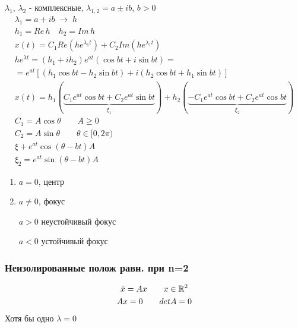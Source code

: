 \documentclass{article}
\begin{document}
\hr
  $\lambda_1$, $\lambda_2$ - комплексные, $\lambda_{1,2}=a\pm ib$, $b>0$
    \begin{gather*}
      \lambda_1=a+ib \; \rightarrow \; h\\ 
      h_1=Re\, h \quad h_2=Im \, h \\ 
      x(t)=C_1 Re(he^{\lambda_1 t}) + C_2 Im(he^{\lambda_1t}) \\ 
      he^{\lambda t}=(h_1+ih_2)e^{at}(\cos bt + i\sin bt)= \\ 
      =e^{at}[(h_1\cos bt - h_2 \sin bt)+i(h_2\cos bt + h_1 \sin bt)] \\ 
      x(t)=h_1( \underbrace{C_1e^{at}\cos bt + C_2 e^{at} \sin bt}_{\xi_1}) + h_2 (\underbrace{-C_1 e^{at}\cos bt + C_2 e^{at} \cos bt}_{\xi_2} ) \\ 
      C_1 = A\cos \theta \qquad A\ge 0 \\ 
      C_2= A\sin \theta \qquad \theta \in [0, 2\pi) \\ 
      \xi + e^{at}\cos (\theta-bt)A \\ 
      \xi_2=e^{at}\sin (\theta-bt)A
    \end{gather*}
    \begin{enumerate}
      \item $a=0$, центр

      \item $a\neq 0$, фокус


        $a>0$ неустойчивый фокус

        $a<0$ устойчивый фокус
    \end{enumerate}
\hr


\subsubsection{Неизолированные полож равн. при n=2}
\begin{gather*}
  \dot{x}=Ax \qquad x \in \mathbb{R}^{2} \\ 
  Ax=0 \qquad det A =0
\end{gather*}
Хотя бы одно $\lambda=0$
\end{document}
